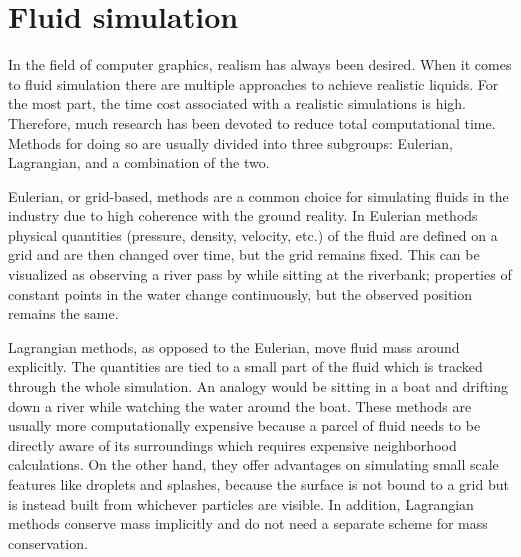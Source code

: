 \documentclass[../../main.tex]{subfiles}
\begin{document}
\tracingall


\section{Fluid simulation}
In the field of computer graphics, realism has always been desired. When it comes to fluid simulation there are multiple approaches to achieve realistic liquids. For the most part, the time cost associated with a realistic simulations is high. Therefore, much research has been devoted to reduce total computational time. Methods for doing so are usually divided into three subgroups: Eulerian, Lagrangian, and a combination of the two.






Eulerian, or grid-based, methods are a common choice for simulating fluids in the industry due to high coherence with the ground reality. In Eulerian methods physical quantities (pressure, density, velocity, etc.) of the fluid are defined on a grid and are then changed over time, but the grid remains fixed. This can be visualized as observing a river pass by while sitting at the riverbank; properties of constant points in the water change continuously, but the observed position remains the same. 

Lagrangian methods, as opposed to the Eulerian, move fluid mass around explicitly. The quantities are tied to a small part of the fluid which is tracked through the whole simulation. An analogy would be sitting in a boat and drifting down a river while watching the water around the boat. These methods are usually more computationally expensive because a parcel of fluid needs to be directly aware of its surroundings which requires expensive neighborhood calculations. On the other hand, they offer advantages on simulating small scale features like droplets and splashes, because the surface is not bound to a grid but is instead built from whichever particles are visible. In addition, Lagrangian methods conserve mass implicitly and do not need a separate scheme for mass conservation. 
\end{document}
